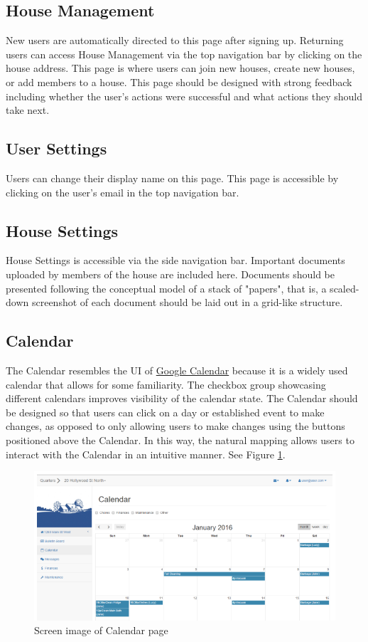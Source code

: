 \documentclass[12pt]{article}
\begin{document}
\subsection{House Management}\label{management}
New users are automatically directed to this page after signing up. Returning users can access House Management via the top navigation bar by clicking on the house address. This page is where users can join new houses, create new houses, or add members to a house. This page should be designed with strong feedback including whether the user's actions were successful and what actions they should take next.

\subsection{User Settings}
Users can change their display name on this page. This page is accessible by clicking on the user's email in the top navigation bar.

\subsection{House Settings}
House Settings is accessible via the side navigation bar. Important documents uploaded by members of the house are included here. Documents should be presented following the conceptual model of a stack of "papers", that is, a scaled-down screenshot of each document should be laid out in a grid-like structure.

\subsection{Calendar}
The Calendar resembles the UI of \href{https://apps.google.com/products/calendar/‎}{Google Calendar} because it is a widely used calendar that allows for some familiarity. The checkbox group showcasing different calendars improves visibility of the calendar state. The Calendar should be designed so that users can click on a day or established event to make changes, as opposed to only allowing users to make changes using the buttons positioned above the Calendar. In this way, the natural mapping allows users to interact with the Calendar in an intuitive manner. See Figure \ref{fig:calendar}.

\begin{figure}
\centering
\includegraphics[width=\textwidth]{calendar}
\caption{Screen image of Calendar page}
\label{fig:calendar}
\end{figure}
\end{document}
